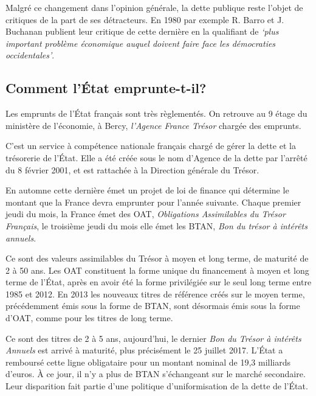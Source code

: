 \documentclass[main.tex]{subfiles}
\begin{document}
Malgré ce changement dans l'opinion générale, la dette publique reste l'objet de critiques de la part de ses détracteurs. En 1980 par exemple R. Barro et J. Buchanan publient leur critique de cette dernière en la qualifiant de \textit{`plus important problème économique auquel doivent faire face les démocraties occidentales'}.
        
\subsection{Comment l'État emprunte-t-il?}
Les emprunts de l'État français sont très règlementés. On retrouve au 9 étage du ministère de l'économie, à Bercy, \emph{l'Agence France Trésor} chargée des emprunts.

\begin{definition}
        C'est un service à compétence nationale français chargé de gérer la dette et la trésorerie de l'État. Elle a été créée sous le nom d'Agence de la dette par l'arrêté du 8 février 2001, et est rattachée à la Direction générale du Trésor.
\end{definition}

En automne cette dernière émet un projet de loi de finance qui détermine le montant que la France devra emprunter pour l'année suivante. Chaque premier jeudi du mois, la France émet des OAT, \emph{Obligations Assimilables du Trésor Français}, le troisième jeudi du mois elle émet les BTAN, \emph{Bon du trésor à intérêts annuels}.

\begin{definition}[OAT]
        Ce sont des valeurs assimilables du Trésor à moyen et long terme, de maturité de 2 à 50 ans. Les OAT constituent la forme unique du financement à moyen et long terme de l'État, après en avoir été la forme privilégiée sur le seul long terme entre 1985 et 2012. En 2013 les nouveaux titres de référence créés sur le moyen terme, précédemment émis sous la forme de BTAN, sont désormais émis sous la forme d’OAT, comme pour les titres de long terme.
\end{definition}

\begin{definition}[BTAN]
        Ce sont des titres de 2 à 5 ans, aujourd'hui, le dernier \emph{Bon du Trésor à intérêts Annuels} est arrivé à maturité, plus précisément le 25 juillet 2017. L’État a remboursé cette ligne obligataire pour un montant nominal de 19,3 milliards d’euros. À ce jour, il n’y a plus de BTAN s’échangeant sur le marché secondaire. Leur disparition fait partie d'une politique d'uniformisation de la dette de l'État.
\end{definition}
\end{document}
